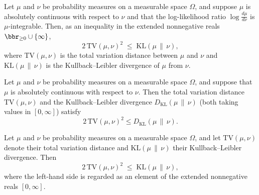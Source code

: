 \begin{theorem}
\label{CommunicationComplexity.pinsker_inequality_of_ac_of_integrable}
\leanok
{}
Let $\mu$ and $\nu$ be probability measures on a measurable space $\Omega$, and suppose
$\mu$ is absolutely continuous with respect to $\nu$ and that the log-likelihood ratio
$\log\frac{d\mu}{d\nu}$ is $\mu$-integrable. Then, as an inequality in the extended
nonnegative reals $\bbr_{\ge 0} \cup \{\infty\}$,
\[
  2\,\mathrm{TV}(\mu,\nu)^2 \;\le\; \mathrm{KL}(\mu \,\|\, \nu),
\]
where $\mathrm{TV}(\mu,\nu)$ is the total variation distance between $\mu$ and $\nu$ and
$\mathrm{KL}(\mu \,\|\, \nu)$ is the Kullback–Leibler divergence of $\mu$ from $\nu$.
\end{theorem}

\begin{theorem}
\label{CommunicationComplexity.pinsker_inequality_of_ac}
\leanok
{}
Let $\mu$ and $\nu$ be probability measures on a measurable space $\Omega$, and suppose
that $\mu$ is absolutely continuous with respect to $\nu$. Then the total variation
distance $\mathrm{TV}(\mu,\nu)$ and the Kullback–Leibler divergence $D_{\mathrm{KL}}(\mu
\,\|\, \nu)$ (both taking values in $[0,\infty]$) satisfy
\[
2\,\mathrm{TV}(\mu,\nu)^2 \le D_{\mathrm{KL}}(\mu \,\|\, \nu).
\]
\end{theorem}

\begin{theorem}
\label{CommunicationComplexity.pinsker_inequality}
\leanok
{}
Let $\mu$ and $\nu$ be probability measures on a measurable space $\Omega$, and let
$\mathrm{TV}(\mu,\nu)$ denote their total variation distance and
$\mathrm{KL}(\mu\,\|\,\nu)$ their Kullback–Leibler divergence. Then
\[
  2\,\mathrm{TV}(\mu,\nu)^2 \;\le\; \mathrm{KL}(\mu\,\|\,\nu),
\]
where the left-hand side is regarded as an element of the extended nonnegative reals
$[0,\infty]$.
\end{theorem}


